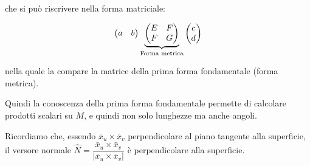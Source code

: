 che si può riscrivere nella forma matriciale:

$$
\begin{pmatrix}
    a & b \\
\end{pmatrix}
\underbrace{
\begin{pmatrix}
E & F \\
F & G
\end{pmatrix}
}_{\text{\scriptsize Forma metrica}}
\begin{pmatrix}
    c \\
    d
\end{pmatrix}
$$

nella quale la compare la matrice della prima forma fondamentale (forma metrica).

Quindi la conoscenza della prima forma fondamentale permette di calcolare prodotti scalari su $M$, e quindi non
solo lunghezze ma anche angoli.

Ricordiamo che, essendo $\bar x_u \times \bar x_v$ perpendicolare al piano tangente alla superficie, il versore normale $\hat N =  \dfrac{\bar x_u \times \bar x_v}{|\bar x_u \times \bar x_v|}$ è perpendicolare alla superficie.

\vspace{1em}

\renewcommand{\qedsymbol}{C.V.D.}

